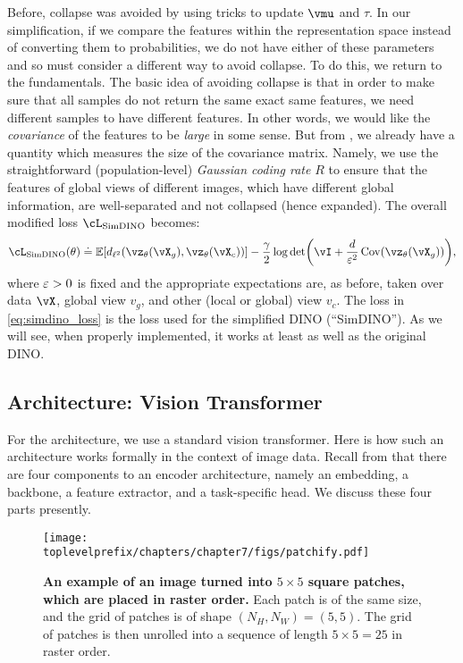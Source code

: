 \documentclass[../../book-main.tex]{subfiles}
\begin{document}
Before, collapse was avoided by using tricks to update \(\vmu\) and \(\tau\). In our simplification, if we compare the features within the representation space instead of converting them to probabilities, we do not have either of these parameters and so must consider a different way to avoid collapse. To do this, we return to the fundamentals. The basic idea of avoiding collapse is that in order to make sure that all samples do not return the same exact same features, we need different samples to have different features. In other words, we would like the \textit{covariance} of the features to be \textit{large} in some sense. But from , we already have a quantity which measures the size of the covariance matrix. Namely, we use the straightforward (population-level) \textit{Gaussian coding rate} \(R\) to ensure that the features of global views of different images, which have different global information, are well-separated and not collapsed (hence expanded). The overall modified loss \(\cL_{\simdino}\) becomes:
\begin{equation}\label{eq:simdino_loss}
    \cL_{\simdino}(\theta) \doteq \Ex[d_{\ell^{2}}(\vz_{\theta}(\vX_{g}),
    \vz_{\theta}(\vX_{c}))] - \frac{\gamma}{2}\log\det\rp{\vI + \frac{d}{\eps^{2}}\Cov(\vz_{\theta}(\vX_{g}))},
\end{equation}
where \(\varepsilon > 0\) is fixed and the appropriate expectations are, as before, taken over data \(\vX\), global view \(v_{g}\), and other (local or global) view \(v_{c}\). The loss in \eqref{eq:simdino_loss} is the loss used for the simplified DINO (``SimDINO''). As we will see, when properly implemented, it works at least as well as the original DINO.

\subsection{Architecture: Vision Transformer}\label{sub:contrastive_learning_architecture}

For the architecture, we use a standard vision transformer. Here is how such an architecture works formally in the context of image data. Recall from  that there are four components to an encoder architecture, namely an embedding, a backbone, a feature extractor, and a task-specific head. We discuss these four parts presently.

\begin{figure}
    \centering 
    \texttt{[image: \\toplevelprefix/chapters/chapter7/figs/patchify.pdf]}
    \caption{\small\textbf{An example of an image turned into \(5 \times 5\) square patches, which are placed in raster order.} Each patch is of the same size, and the grid of patches is of shape \((N_{H}, N_{W}) = (5, 5)\). The grid of patches is then unrolled into a sequence of length \(5 \times 5 = 25\) in raster order.}
    \label{fig:patchify_rasterize}
\end{figure}
\end{document}
